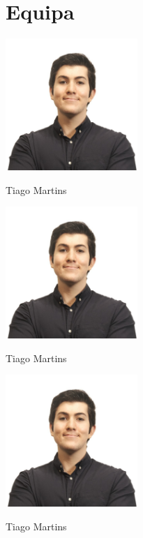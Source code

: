 \documentclass[12pt]{article}
\begin{document}
\section{Equipa}
\centering
\includegraphics[width=5cm]{./assets/index.jpg}

Tiago Martins

\includegraphics[width=5cm]{./assets/index.jpg}

Tiago Martins

\includegraphics[width=5cm]{./assets/index.jpg}

Tiago Martins

\pagebreak

\tableofcontents
\pagebreak







\newpage


\end{document}
